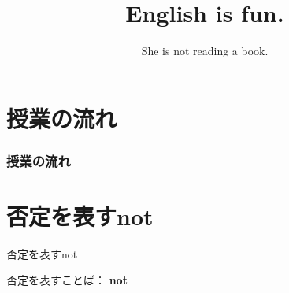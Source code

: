 \documentclass[aspectratio=169,xcolor={dvipsnames,table}]{beamer}
\title{English is fun.}
\subtitle{She is not reading a book.}
\author{}
\institute[]{}
\date[]
\begin{document}
\begin{frame}[plain]
  \titlepage
\end{frame}
\section*{授業の流れ}
\begin{frame}[plain]
  \frametitle{授業の流れ}
  \tableofcontents
\end{frame}
\section{否定を表すnot}
\begin{frame}[plain]{否定を表すnot}
 \Large

否定を表すことば： {\LARGE\bfseries not}\hspace{20pt}
\end{frame}
\end{document}
